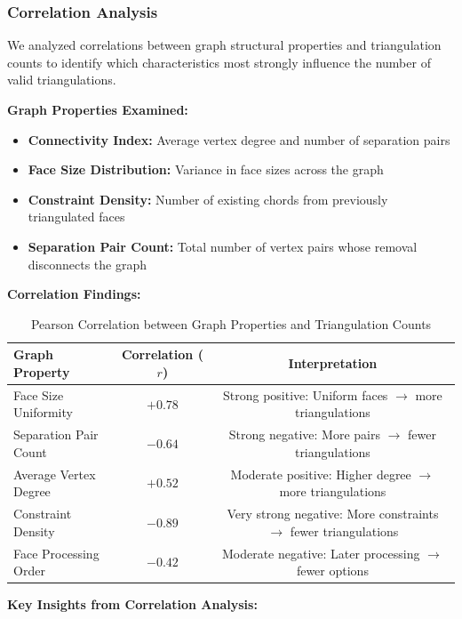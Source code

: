 \documentclass[12pt,a4paper]{article}
\theoremstyle{definition}
\theoremstyle{remark}
\begin{document}
\subsubsection{Correlation Analysis}

We analyzed correlations between graph structural properties and triangulation counts to identify which characteristics most strongly influence the number of valid triangulations.

\textbf{Graph Properties Examined:}

\begin{itemize}
    \item \textbf{Connectivity Index:} Average vertex degree and number of separation pairs
    \item \textbf{Face Size Distribution:} Variance in face sizes across the graph
    \item \textbf{Constraint Density:} Number of existing chords from previously triangulated faces
    \item \textbf{Separation Pair Count:} Total number of vertex pairs whose removal disconnects the graph
\end{itemize}

\textbf{Correlation Findings:}

\begin{table}[H]
\centering
\caption{Pearson Correlation between Graph Properties and Triangulation Counts}
\label{tab:correlation_analysis}
\small
\begin{tabular}{|l|c|c|}
\hline
\textbf{Graph Property} & \textbf{Correlation ($r$)} & \textbf{Interpretation} \\
\hline
Face Size Uniformity & $+0.78$ & Strong positive: Uniform faces $\to$ more triangulations \\
\hline
Separation Pair Count & $-0.64$ & Strong negative: More pairs $\to$ fewer triangulations \\
\hline
Average Vertex Degree & $+0.52$ & Moderate positive: Higher degree $\to$ more triangulations \\
\hline
Constraint Density & $-0.89$ & Very strong negative: More constraints $\to$ fewer triangulations \\
\hline
Face Processing Order & $-0.42$ & Moderate negative: Later processing $\to$ fewer options \\
\hline
\end{tabular}
\end{table}

\textbf{Key Insights from Correlation Analysis:}
\end{document}
